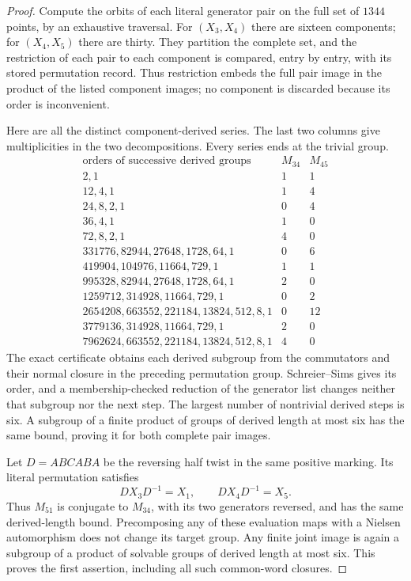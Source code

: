 \begin{proof}
Compute the orbits of each literal generator pair on the
full set of $1344$ points, by an exhaustive traversal.
For $(X_3,X_4)$ there are sixteen components; for
$(X_4,X_5)$ there are thirty. They partition the complete
set, and the restriction of each pair to each component is
compared, entry by entry, with its stored permutation record.
Thus restriction embeds the full pair image in the product
of the listed component images; no component is discarded
because its order is inconvenient.

Here are all the distinct component-derived series. The last
two columns give multiplicities in the two decompositions.
Every series ends at the trivial group.
\[
\begin{array}{l|r|r}
 \text{orders of successive derived groups}&M_{34}&M_{45}\\\hline
 2,1&1&1\\
 12,4,1&1&4\\
 24,8,2,1&0&4\\
 36,4,1&1&0\\
 72,8,2,1&4&0\\
 331776,82944,27648,1728,64,1&0&6\\
 419904,104976,11664,729,1&1&1\\
 995328,82944,27648,1728,64,1&2&0\\
 1259712,314928,11664,729,1&0&2\\
 2654208,663552,221184,13824,512,8,1&0&12\\
 3779136,314928,11664,729,1&2&0\\
 7962624,663552,221184,13824,512,8,1&4&0
\end{array}
\]
The exact certificate obtains each derived subgroup from
the commutators and their normal closure in the preceding
permutation group. Schreier--Sims gives its order, and a
membership-checked reduction of the generator list changes
neither that subgroup nor the next step. The largest number
of nontrivial derived steps is six. A subgroup of a finite
product of groups of derived length at most six has the same
bound, proving it for both complete pair images.

Let $D=ABCABA$ be the reversing half twist in the same
positive marking. Its literal permutation satisfies
\[
                  DX_3D^{-1}=X_1,\qquad
                  DX_4D^{-1}=X_5.
\]
Thus $M_{51}$ is conjugate to $M_{34}$, with its two
generators reversed, and has the same derived-length bound.
Precomposing any of these evaluation maps with a Nielsen
automorphism does not change its target group. Any finite
joint image is again a subgroup of a product of solvable
groups of derived length at most six. This proves the
first assertion, including all such common-word closures.


\end{proof}
